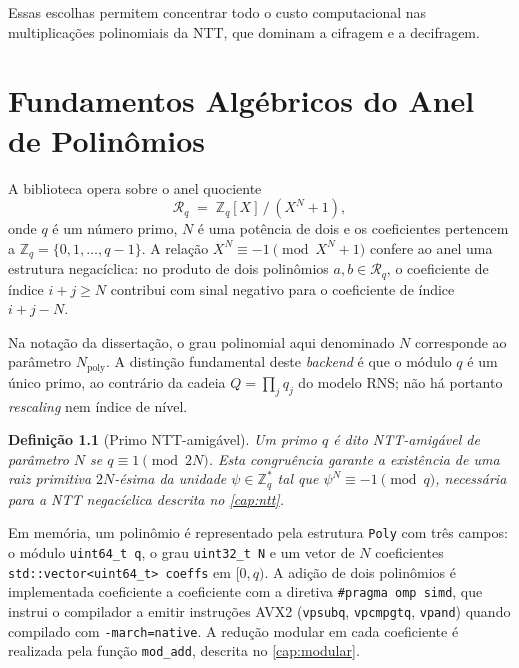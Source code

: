 \documentclass[11pt,a4paper]{report}
\newtheorem{definition}{Definição}[chapter]
\newcommand{\Rq}{\mathcal{R}_q}
\newcommand{\Zq}{\mathbb{Z}_q}
\newcommand{\npoly}{N_{\text{poly}}}
\begin{document}
Essas escolhas permitem concentrar todo o custo computacional nas multiplicações
polinomiais da NTT, que dominam a cifragem e a decifragem.

\chapter{Fundamentos Algébricos do Anel de Polinômios}
\label{cap:ring}

A biblioteca opera sobre o anel quociente
\begin{equation}
  \Rq \;=\; \mathbb{Z}_q[X]\,/\,(X^N + 1),
  \label{eq:ring}
\end{equation}
onde $q$ é um número primo, $N$ é uma potência de dois e os coeficientes pertencem a
$\Zq = \{0, 1, \ldots, q-1\}$. A relação $X^N \equiv -1 \pmod{X^N+1}$ confere ao anel
uma estrutura negacíclica: no produto de dois polinômios $a, b \in \Rq$, o coeficiente
de índice $i+j \geq N$ contribui com sinal negativo para o coeficiente de índice $i+j-N$.

Na notação da dissertação, o grau polinomial aqui denominado $N$ corresponde ao parâmetro
$\npoly$. A distinção fundamental deste \emph{backend} é que o módulo $q$ é um único
primo, ao contrário da cadeia $Q = \prod_j q_j$ do modelo RNS; não há portanto
\emph{rescaling} nem índice de nível.

\begin{definition}[Primo NTT-amigável]
\label{def:ntt_prime}
Um primo $q$ é dito NTT-amigável de parâmetro $N$ se $q \equiv 1 \pmod{2N}$. Esta
congruência garante a existência de uma raiz primitiva $2N$-ésima da unidade
$\psi \in \mathbb{Z}_q^*$ tal que $\psi^N \equiv -1 \pmod{q}$, necessária para a
NTT negacíclica descrita no \cref{cap:ntt}.
\end{definition}

Em memória, um polinômio é representado pela estrutura \texttt{Poly} com três campos:
o módulo \texttt{uint64\_t q}, o grau \texttt{uint32\_t N} e um vetor de $N$ coeficientes
\texttt{std::vector<uint64\_t> coeffs} em $[0, q)$. A adição de dois polinômios é
implementada coeficiente a coeficiente com a diretiva \texttt{\#pragma omp simd}, que
instrui o compilador a emitir instruções AVX2 (\texttt{vpsubq}, \texttt{vpcmpgtq},
\texttt{vpand}) quando compilado com \texttt{-march=native}. A redução modular em cada
coeficiente é realizada pela função \texttt{mod\_add}, descrita no \cref{cap:modular}.
\end{document}
